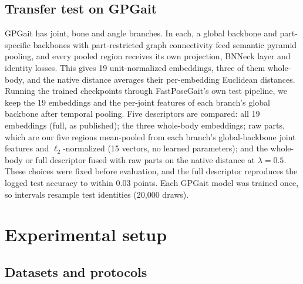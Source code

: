 \documentclass[journal]{IEEEtran}
\begin{document}
\subsection{Transfer test on GPGait}
\label{sec:gpgait-design}

GPGait has joint, bone and angle branches. In each, a global backbone and
part-specific backbones with part-restricted graph connectivity feed semantic
pyramid pooling, and every pooled region receives its own projection, BNNeck
layer and identity losses. This gives 19 unit-normalized embeddings, three of
them whole-body, and the native distance averages their per-embedding Euclidean
distances. Running the trained checkpoints through FastPoseGait's own test
pipeline, we keep the 19 embeddings and the per-joint features of each branch's
global backbone after temporal pooling. Five descriptors are compared: all 19
embeddings (full, as published); the three whole-body embeddings; raw parts,
which are our five regions mean-pooled from each branch's global-backbone joint
features and $\ell_2$-normalized (15 vectors, no learned parameters); and the
whole-body or full descriptor fused with raw parts on the native distance at
$\lambda=0.5$. These choices were fixed before evaluation, and the full
descriptor reproduces the logged test accuracy to within 0.03 points. Each
GPGait model was trained once, so intervals resample test identities (20,000
draws).

\section{Experimental setup}
\label{sec:setup}

\subsection{Datasets and protocols}
\label{sec:data}
\end{document}
